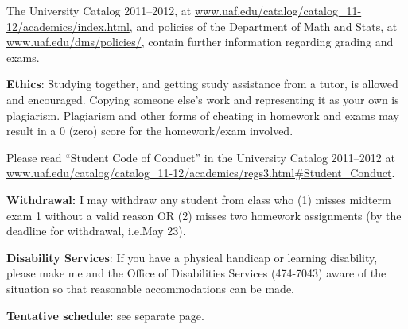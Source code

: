 \documentclass{article}
\begin{document}
The University Catalog 2011--2012,
at \url{www.uaf.edu/catalog/catalog_11-12/academics/index.html},
and policies of the Department of Math and Stats,
at \url{www.uaf.edu/dms/policies/},
contain further information regarding
grading and exams.

\bigskip
\textbf{\large Ethics}:
Studying together, and getting study assistance from a tutor, is allowed
and encouraged. Copying someone else's work and representing it as your
own is plagiarism. Plagiarism and other forms of cheating in homework
and exams may result in a 0 (zero) score for the homework/exam
involved.

Please read ``Student Code of Conduct'' in the University Catalog
2011--2012
at
\url{www.uaf.edu/catalog/catalog_11-12/academics/regs3.html#Student_Conduct}.


\bigskip
\textbf{\large Withdrawal:}
I may withdraw any student from class who
(1) misses midterm exam 1 without a valid reason OR
(2) misses two homework assignments (by the deadline for withdrawal,
i.e.\@ May 23).


\bigskip
\textbf{\large Disability Services}:
If you have a physical handicap or learning disability, please make me
and the Office of Disabilities Services (474-7043) aware of the
situation so that reasonable accommodations can be made.

\bigskip
\textbf{\large Tentative schedule}: see separate page.
\end{document}

